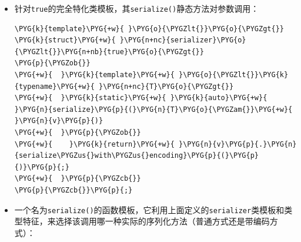 \begin{itemize}

\begin{codeblockbg}
\begin{Verbatim}[commandchars=\\\{\},breaklines=true,breakanywhere=true,fontsize=\codefont,xleftmargin=17bp]
\PYG{k}{template}\PYG{+w}{ }\PYG{o}{\PYGZlt{}}\PYG{k+kt}{bool}\PYG{+w}{ }\PYG{n}{b}\PYG{o}{\PYGZgt{}}
\PYG{k}{struct}\PYG{+w}{ }\PYG{n+nc}{serializer}
\PYG{p}{\PYGZob{}}
\PYG{+w}{  }\PYG{k}{template}\PYG{+w}{ }\PYG{o}{\PYGZlt{}}\PYG{k}{typename}\PYG{+w}{ }\PYG{n+nc}{T}\PYG{o}{\PYGZgt{}}
\PYG{+w}{  }\PYG{k}{static}\PYG{+w}{ }\PYG{k}{auto}\PYG{+w}{ }\PYG{n}{serialize}\PYG{p}{(}\PYG{n}{T}\PYG{o}{\PYGZam{}}\PYG{+w}{ }\PYG{n}{v}\PYG{p}{)}
\PYG{+w}{  }\PYG{p}{\PYGZob{}}
\PYG{+w}{    }\PYG{k}{return}\PYG{+w}{ }\PYG{n}{v}\PYG{p}{.}\PYG{n}{serialize}\PYG{p}{(}\PYG{p}{)}\PYG{p}{;}
\PYG{+w}{  }\PYG{p}{\PYGZcb{}}
\PYG{p}{\PYGZcb{}}\PYG{p}{;}
\end{Verbatim}
\end{codeblockbg}



\item 针对\texttt{true}的完全特化类模板，其\texttt{serialize()}静态方法对参数调用：



\begin{codeblockbg}
\begin{Verbatim}[commandchars=\\\{\},breaklines=true,breakanywhere=true,fontsize=\codefont,xleftmargin=17bp]
\PYG{k}{template}\PYG{+w}{ }\PYG{o}{\PYGZlt{}}\PYG{o}{\PYGZgt{}}
\PYG{k}{struct}\PYG{+w}{ }\PYG{n+nc}{serializer}\PYG{o}{\PYGZlt{}}\PYG{n+nb}{true}\PYG{o}{\PYGZgt{}}
\PYG{p}{\PYGZob{}}
\PYG{+w}{  }\PYG{k}{template}\PYG{+w}{ }\PYG{o}{\PYGZlt{}}\PYG{k}{typename}\PYG{+w}{ }\PYG{n+nc}{T}\PYG{o}{\PYGZgt{}}
\PYG{+w}{  }\PYG{k}{static}\PYG{+w}{ }\PYG{k}{auto}\PYG{+w}{ }\PYG{n}{serialize}\PYG{p}{(}\PYG{n}{T}\PYG{o}{\PYGZam{}}\PYG{+w}{ }\PYG{n}{v}\PYG{p}{)}
\PYG{+w}{  }\PYG{p}{\PYGZob{}}
\PYG{+w}{    }\PYG{k}{return}\PYG{+w}{ }\PYG{n}{v}\PYG{p}{.}\PYG{n}{serialize\PYGZus{}with\PYGZus{}encoding}\PYG{p}{(}\PYG{p}{)}\PYG{p}{;}
\PYG{+w}{  }\PYG{p}{\PYGZcb{}}
\PYG{p}{\PYGZcb{}}\PYG{p}{;}
\end{Verbatim}
\end{codeblockbg}



\item 一个名为\texttt{serialize()}的函数模板，它利用上面定义的\texttt{serializer}类模板和类型特征，来选择该调用哪一种实际的序列化方法（普通方式还是带编码方式）：



\end{itemize}
